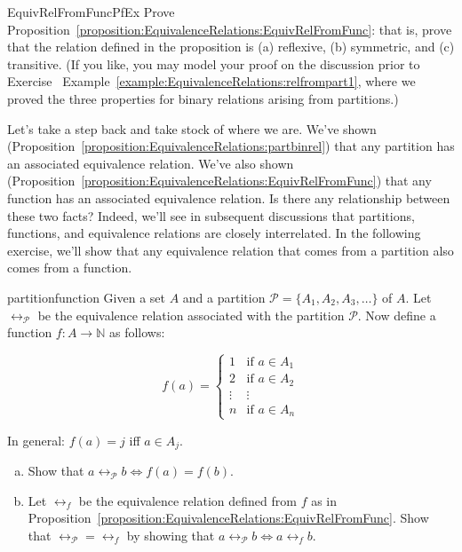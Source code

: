 \begin{exercise}{EquivRelFromFuncPfEx}
Prove Proposition~\ref{proposition:EquivalenceRelations:EquivRelFromFunc}: that is, prove that the relation defined in the proposition is (a) reflexive, (b) symmetric, and (c) transitive.  (If you like, you may model your proof on the discussion prior to Exercise~ Example~\ref{example:EquivalenceRelations:relfrompart1}, where we proved the three properties for binary relations arising from partitions.)

\end{exercise}

Let's take a step back and take stock of where we are. We've shown (Proposition~\ref{proposition:EquivalenceRelations:partbinrel}) that any partition has an associated equivalence relation. We've also shown (Proposition~\ref{proposition:EquivalenceRelations:EquivRelFromFunc}) that any function has an associated equivalence relation. Is there any relationship between these two facts? Indeed, we'll see in subsequent discussions that partitions, functions, and equivalence relations are closely interrelated. In the following exercise, we'll show that any equivalence relation that comes from a partition also comes from a function.

\begin{exercise}{partitionfunction}
Given a set $A$ and a partition $\mathcal{P}=\{A_1, A_2, A_3, \ldots\}$ of $A$.  Let $\rel_\mathcal{P}$ be the equivalence relation associated with the partition $\mathcal{P}$. Now define a function $f:A \rightarrow \mathbb{N}$ as follows:

$$f(a)=
\begin{cases}
1 & \mbox{if $a \in A_1$} \\
2 & \mbox{if $a \in A_2$} \\
\vdots & \vdots \\
n & \mbox{if $a \in A_n$}
\end{cases}$$

In general: $f(a)=j$ iff $a \in A_j$.
\begin{enumerate}[(a)]
\item
Show that $a \rel_\mathcal{P} b \iff f(a)=f(b)$.
\item 
Let $\rel_f$ be the equivalence relation defined from $f$ as in Proposition~\ref{proposition:EquivalenceRelations:EquivRelFromFunc}. 
Show that $\rel_\mathcal{P} = \rel_f$ by showing that $a \rel_\mathcal{P} b \iff a \rel_f b$.
\end{enumerate}
\end{exercise}

